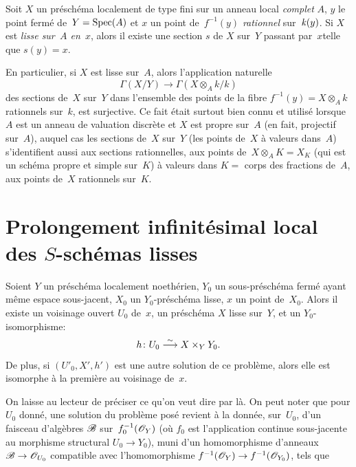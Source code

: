 \begin{corollaire}
\label{III.3.3}
Soit $X$ un pr\'esch\'ema localement de type fini sur un anneau
local {\emph{complet}} $A$, $y$ le point ferm\'e de~$Y=\operatorname{Spec}(A)$ et
$x$ un point de~$f^{-1}(y)$ {\emph{rationnel}}
sur~$\mathit{k}(y)$. Si $X$
est {\emph{lisse sur~$A$ en~$x$}}, alors il existe une section $s$ de
$X$ sur~$Y$ \og passant par~$x$\fg \ie telle que $s(y)=x$.
\end{corollaire}

En particulier, si $X$ est lisse sur~$A$, alors l'application
naturelle
$$
\Gamma(X/Y)\to\Gamma(X\otimes_A k/k)
$$
des sections de~$X$ sur~$Y$ dans l'ensemble des points de la fibre
$f^{-1}(y)=X\otimes_A k$ rationnels sur~$k$, est surjective. Ce fait
\'etait surtout bien connu et utilis\'e lorsque $A$ est un anneau
de valuation discr\`ete et $X$
est propre sur~$A$ (en fait, projectif sur~$A$), auquel cas les
sections de~$X$ sur~$Y$ (\ie les \og points de~$X$ \`a valeurs
dans~$A$\fg) s'identifient aussi aux sections rationnelles, \ie aux
points de~$X\otimes_A K=X_K$ (qui est un sch\'ema propre et simple
sur~$K$) \`a valeurs dans $K=$ corps des fractions
de~$A$,
\ie aux
points de~$X$ rationnels sur~$K$.

\section{Prolongement infinit\'esimal local des $S$-sch\'emas lisses}
\label{III.4}

\begin{theoreme}
\label{III.4.1}
Soient $Y$ un pr\'esch\'ema localement noeth\'erien, $Y_0$ un
sous-pr\'e\-sch\'ema ferm\'e ayant m\^eme espace sous-jacent,
$X_0$ un $Y_0$-pr\'esch\'ema lisse, $x$ un point de~$X_0$. Alors
il existe un voisinage ouvert $U_0$ de~$x$, un pr\'esch\'ema $X$
lisse sur~$Y$, et un $Y_0$-isomorphisme:
$$
h\colon U_0\overset{\sim}{\longrightarrow} X\times_Y Y_0.
$$
De plus, si $(U'_0,X',h')$ est une autre solution de ce probl\`eme,
alors \og elle est isomorphe \`a la premi\`ere au voisinage
de~$x$\fg.
\end{theoreme}

On laisse au lecteur de pr\'eciser ce qu'on veut dire par l\`a. On
peut noter que pour $U_0$ donn\'e, une solution du
probl\`eme pos\'e
revient \`a la donn\'ee, sur~$U_0$, d'un faisceau d'alg\`ebres
$\cal{B}$ sur~$f_0^{-1}(\cal{O}_Y)$ (o\`u $f_0$ est l'application
continue sous-jacente au morphisme structural $U_0\to Y_0$), muni d'un
homomorphisme d'anneaux $\cal{B}\to \cal{O}_{U_0}$ compatible avec
l'homomorphisme $f^{-1}(\cal{O}_Y)\to f^{-1}(\cal{O}_{Y_0})$, tels que

